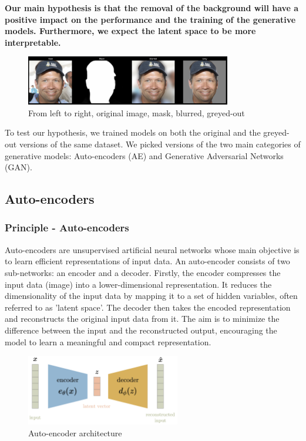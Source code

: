 \documentclass{article}
\begin{document}
\textbf{Our main hypothesis is that the removal of the background will have a positive impact on the performance and the training of the generative models. 
Furthermore, we expect the latent space to be more interpretable.}

\begin{figure}[H]
    \centering
    \includegraphics[width=0.8\textwidth]{images/mask.png}
    \caption{From left to right, original image, mask, blurred, greyed-out}
\end{figure}

To test our hypothesis, we trained models on both the original and the greyed-out versions of the same dataset. 
We picked versions of the two main categories of generative models: Auto-encoders (AE) and Generative Adversarial Networks (GAN).

\subsection{Auto-encoders}
\subsubsection*{Principle - Auto-encoders}

\quad Auto-encoders are unsupervised artificial neural networks whose main objective is to learn efficient representations of input data. 
An auto-encoder consists of two sub-networks: an encoder and a decoder. 
Firstly, the encoder compresses the input data (image) into a lower-dimensional representation. 
It reduces the dimensionality of the input data by mapping it to a set of hidden variables, often referred to as 'latent space'. 
The decoder then takes the encoded representation and reconstructs the original input data from it. 
The aim is to minimize the difference between the input and the reconstructed output, encouraging the model to learn a meaningful and compact representation.

\begin{figure}[H]
    \centering
    \includegraphics[width=0.6\textwidth]{images/ae.png}
    \caption{Auto-encoder architecture}
\end{figure}
\end{document}
